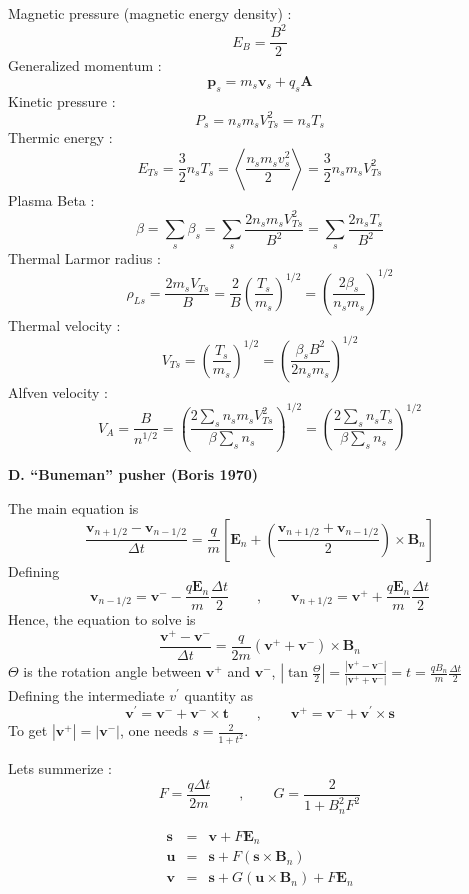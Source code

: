 \documentclass[a4paper,11pt]{letter}
\begin{document}
Magnetic pressure (magnetic energy density) :
$$
E_B = \frac{B^2}{2}
$$
Generalized momentum :
$$
\mathbf p_s = m_s \mathbf v_s + q_s \mathbf A
$$
Kinetic pressure :
$$
P_s = n_s m_s V_{Ts}^2 = n_s T_s
$$
Thermic energy :
$$
E_{Ts} = \frac{3}{2} n_s T_s = \left\langle \frac{n_s m_s v_s^2}{2} \right\rangle = \frac{3}{2} n_s m_s V_{Ts}^2
$$
Plasma Beta :
$$
\beta = \sum_s \beta_s = \sum_s \frac{2 n_s m_s V_{Ts}^2}{B^2} = \sum_s \frac{2 n_s T_s}{B^2}
$$
Thermal Larmor radius :
$$
\rho_{Ls} = \frac{2 m_s V_{Ts}}{B} = \frac{2}{B} \left(\frac{T_s}{m_s}\right)^{1/2} = \left(\frac{2 \beta_s}{n_s m_s}\right)^{1/2}
$$
Thermal velocity :
$$
V_{Ts} = \left(\frac{T_s}{m_s}\right)^{1/2} = \left(\frac{\beta_s B^2}{2 n_s m_s}\right)^{1/2}
$$
Alfven velocity :
$$
V_A = \frac{B}{n^{1/2}} = \left(\frac{2 \sum_s n_s m_s V_{Ts}^2}{\beta \sum_s n_s}\right)^{1/2} = \left(\frac{2 \sum_s n_s T_s}{\beta \sum_s n_s}\right)^{1/2}
$$

\newpage

{\bf D. ``Buneman'' pusher (Boris 1970)}

The main equation is
$$
\frac{\mathbf v_{n+1/2}-\mathbf v_{n-1/2}}{\Delta t} = \frac{q}{m} \left[ \mathbf E_n + \left(\frac{\mathbf v_{n+1/2}+\mathbf v_{n-1/2}}{2} \right) \times \mathbf B_n \right]
$$
Defining
$$
\mathbf v_{n-1/2} = \mathbf v^- - \frac{q \mathbf E_n}{m} \frac{\Delta t}{2} \,\,\,\,\,\,\,\,\,\,\,\, , \,\,\,\,\,\,\,\,\,\,\,\, \mathbf v_{n+1/2} = \mathbf v^+ + \frac{q \mathbf E_n}{m} \frac{\Delta t}{2}
$$
Hence, the equation to solve is
$$
\frac{\mathbf v^+-\mathbf v^-}{\Delta t} = \frac{q}{2 m} (\mathbf v^++\mathbf v^-) \times \mathbf B_n
$$
$\Theta$ is the rotation angle between $\mathbf v^+$ and $\mathbf v^-$, $\displaystyle \left|\tan \frac{\Theta}{2} \right| = \frac{|\mathbf v^+-\mathbf v^-|}{|\mathbf v^++\mathbf v^-|} = t = \frac{q B_n}{m} \frac{\Delta t}{2}$
Defining the intermediate $v^{\prime}$ quantity as
$$
\mathbf v^{\prime} = \mathbf v^- + \mathbf v^- \times \mathbf t \,\,\,\,\,\,\,\,\,\,\,\, , \,\,\,\,\,\,\,\,\,\,\,\, \mathbf v^+ = \mathbf v^- + \mathbf v^{\prime} \times \mathbf s
$$
To get $|\mathbf v^+| = |\mathbf v^-|$, one needs $\displaystyle s = \frac{2}{1+t^2}$.

Lets summerize :
$$
F = \frac{q \Delta t}{2 m} \,\,\,\,\,\,\,\,\,\,\,\, , \,\,\,\,\,\,\,\,\,\,\,\, G = \frac{2}{1 + B_n^2 F^2}
$$

\begin{eqnarray*}
\mathbf s & = & \mathbf v + F \mathbf E_n\\
\mathbf u & = & \mathbf s + F (\mathbf s \times \mathbf B_n)\\
\mathbf v & = & \mathbf s + G (\mathbf u \times \mathbf B_n) + F \mathbf E_n
\end{eqnarray*}
\end{document}
